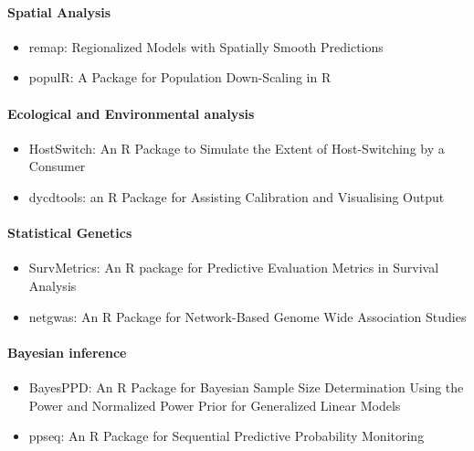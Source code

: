 \hypertarget{spatial-analysis}{%
\paragraph{Spatial Analysis}\label{spatial-analysis}}

\begin{itemize}
\tightlist
\item
  remap: Regionalized Models with Spatially Smooth Predictions
\item
  populR: A Package for Population Down-Scaling in R
\end{itemize}

\hypertarget{ecological-and-environmental-analysis}{%
\paragraph{Ecological and Environmental analysis}\label{ecological-and-environmental-analysis}}

\begin{itemize}
\tightlist
\item
  HostSwitch: An R Package to Simulate the Extent of Host-Switching by a Consumer
\item
  dycdtools: an R Package for Assisting Calibration and Visualising Output
\end{itemize}

\hypertarget{statistical-genetics}{%
\paragraph{Statistical Genetics}\label{statistical-genetics}}

\begin{itemize}
\tightlist
\item
  SurvMetrics: An R package for Predictive Evaluation Metrics in Survival Analysis
\item
  netgwas: An R Package for Network-Based Genome Wide Association Studies
\end{itemize}

\hypertarget{bayesian-inference}{%
\paragraph{Bayesian inference}\label{bayesian-inference}}

\begin{itemize}
\tightlist
\item
  BayesPPD: An R Package for Bayesian Sample Size Determination Using the Power and Normalized Power Prior for Generalized Linear Models
\item
  ppseq: An R Package for Sequential Predictive Probability Monitoring
\end{itemize}

